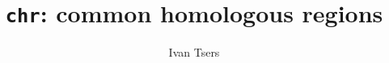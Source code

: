 \documentclass[a4paper]{article}
\begin{document}
\pagestyle{noweb}

\title{\texttt{chr}: common homologous regions}
\author{Ivan Tsers}
\maketitle
\tableofcontents






\end{document}
